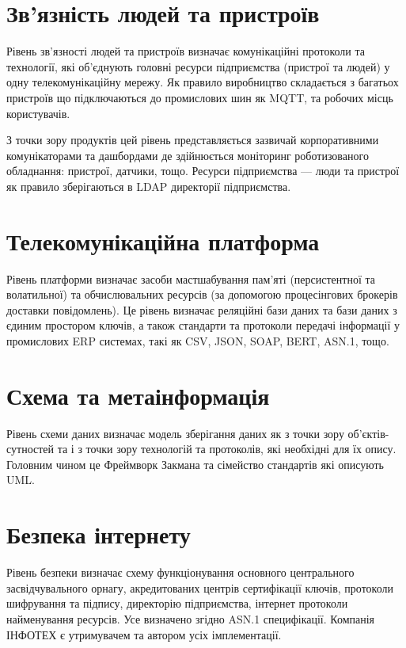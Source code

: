 \section{Зв'язність людей та пристроїв}

Рівень зв'язності людей та пристроїв визначає комунікаційні протоколи та технології,
які об'єднують головні ресурси підприємства (пристрої та людей) у одну
телекомунікаційну мережу. Як правило виробництво складається з багатьох пристроїв
що підключаються до промислових шин як MQTT, та робочих місць користувачів.

З точки зору продуктів цей рівень представляється зазвичай корпоративними
комунікаторами та дашбордами де здійнюється моніторинг роботизованого обладнання:
пристрої, датчики, тощо. Ресурси підприємства — люди та пристрої як правило
зберігаються в LDAP директорії підприємства.

\section{Телекомунікаційна платформа}

Рівень платформи визначає засоби мастшабування пам'яті (персистентної та волатильної) та
обчислювальних ресурсів (за допомогою процесінгових брокерів доставки повідомлень).
Це рівень визначає реляційні бази даних та бази даних з єдиним простором ключів,
а також стандарти та протоколи передачі інформації у промислових ERP системах,
такі як CSV, JSON, SOAP, BERT, ASN.1, тощо.

\section{Схема та метаінформація}

Рівень схеми даних визначає модель зберігання даних як з точки зору об'єктів-сутностей
та і з точки зору технологій та протоколів, які необхідні для їх опису.
Головним чином це Фреймворк Закмана та сімейство стандартів які описують UML.

\section{Безпека інтернету}

Рівень безпеки визначає схему функціонування основного центрального засвідчувального орнагу,
акредитованих центрів сертифікації ключів, протоколи шифрування та підпису, директорію
підприємства, інтернет протоколи найменування ресурсів. Усе визначено згідно ASN.1 специфікації.
Компанія ІНФОТЕХ є утримувачем та автором усіх імплементації.

